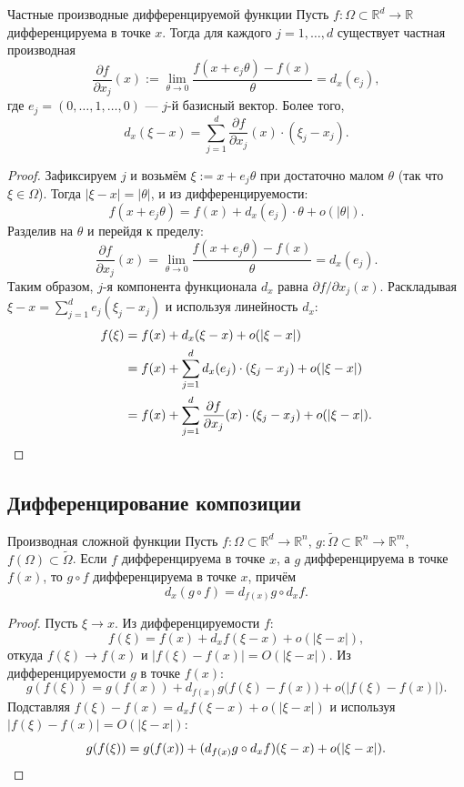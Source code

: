 \begin{Statement}{Частные производные дифференцируемой функции}{}
	Пусть $f:\Omega\subset\mathbb{R}^d\to\mathbb{R}$ дифференцируема в точке $x$. Тогда для каждого
	$j=1,\ldots,d$ существует частная производная
	\[
	\frac{\partial f}{\partial x_j}(x)
	:=\lim_{\theta\to0}\frac{f(x+e_j\theta)-f(x)}{\theta}
	=d_x(e_j),
	\]
	где $e_j=(0,\ldots,1,\ldots,0)$ --- $j$-й базисный вектор. Более того,
	\[
	d_x(\xi-x)=\sum_{j=1}^d\frac{\partial f}{\partial x_j}(x)\cdot(\xi_j-x_j).
	\]
\end{Statement}

\begin{proof}
	Зафиксируем $j$ и возьмём $\xi:=x+e_j\theta$ при достаточно малом $\theta$ (так что $\xi\in\Omega$).
	Тогда $|\xi-x|=|\theta|$, и из дифференцируемости:
	\[
	f(x+e_j\theta)=f(x)+d_x(e_j)\cdot\theta+o(|\theta|).
	\]
	Разделив на $\theta$ и перейдя к пределу:
	\[
	\frac{\partial f}{\partial x_j}(x)
	=\lim_{\theta\to0}\frac{f(x+e_j\theta)-f(x)}{\theta}
	=d_x(e_j).
	\]
	Таким образом, $j$-я компонента функционала $d_x$ равна $\partial f/\partial x_j(x)$.
	Раскладывая $\xi-x=\sum_{j=1}^d e_j(\xi_j-x_j)$ и используя линейность $d_x$:
	\begin{align*}
		f(\xi)
		&=f(x)+d_x(\xi-x)+o(|\xi-x|)\\
		&=f(x)+\sum_{j=1}^d d_x(e_j)\cdot(\xi_j-x_j)+o(|\xi-x|)\\
		&=f(x)+\sum_{j=1}^d\frac{\partial f}{\partial x_j}(x)\cdot(\xi_j-x_j)+o(|\xi-x|).\qedhere
	\end{align*}
\end{proof}

\subsection{Дифференцирование композиции}

\begin{Theorem}{Производная сложной функции}{}
	Пусть $f:\Omega\subset\mathbb{R}^d\to\mathbb{R}^n$, $g:\widetilde\Omega\subset\mathbb{R}^n\to\mathbb{R}^m$,
	$f(\Omega)\subset\widetilde\Omega$. Если $f$ дифференцируема в точке $x$, а $g$ дифференцируема
	в точке $f(x)$, то $g\circ f$ дифференцируема в точке $x$, причём
	\[
	d_x(g\circ f)=d_{f(x)}g\circ d_xf.
	\]
\end{Theorem}

\begin{proof}
	Пусть $\xi\to x$. Из дифференцируемости $f$:
	\[
	f(\xi)=f(x)+d_xf(\xi-x)+o(|\xi-x|),
	\]
	откуда $f(\xi)\to f(x)$ и $|f(\xi)-f(x)|=O(|\xi-x|)$.
	Из дифференцируемости $g$ в точке $f(x)$:
	\[
	g(f(\xi))=g(f(x))+d_{f(x)}g\bigl(f(\xi)-f(x)\bigr)+o\bigl(|f(\xi)-f(x)|\bigr).
	\]
	Подставляя $f(\xi)-f(x)=d_xf(\xi-x)+o(|\xi-x|)$ и используя $|f(\xi)-f(x)|=O(|\xi-x|)$:
	\[
	g(f(\xi))=g(f(x))+(d_{f(x)}g\circ d_xf)(\xi-x)+o(|\xi-x|).\qedhere
	\]
\end{proof}